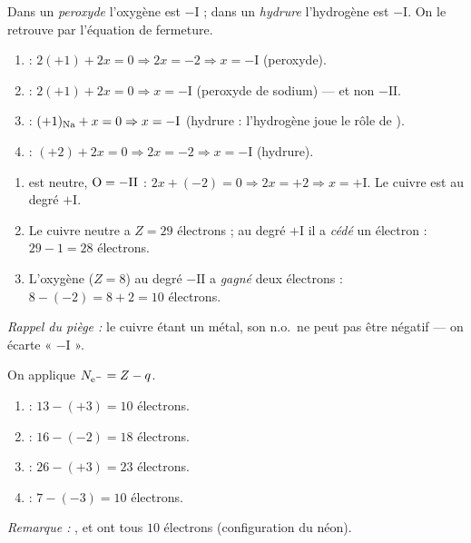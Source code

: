 \documentclass[11pt,a4paper]{article}
\begin{document}
\begin{corrige}
Dans un \emph{peroxyde} l'oxygène est $-\mathrm{I}$ ; dans un \emph{hydrure} l'hydrogène est $-\mathrm{I}$.
On le retrouve par l'équation de fermeture.
\begin{enumerate}[label=\alph*)]
  \item {} : $2(+1)+2x=0 \Rightarrow 2x=-2 \Rightarrow x=-\mathrm{I}$ (peroxyde).
  \item {} : $2(+1)+2x=0 \Rightarrow x=-\mathrm{I}$ (peroxyde de sodium) — et non $-\mathrm{II}$.
  \item {} : $(+1)_{\ce{Na}}+x=0 \Rightarrow x=-\mathrm{I}$ (hydrure : l'hydrogène joue le rôle de ).
  \item {} : $(+2)+2x=0 \Rightarrow 2x=-2 \Rightarrow x=-\mathrm{I}$ (hydrure).
\end{enumerate}
\end{corrige}

\begin{corrige}
\begin{enumerate}[label=\alph*)]
  \item {} est neutre, $\ce{O}=-\mathrm{II}$ : $2x+(-2)=0 \Rightarrow 2x=+2 \Rightarrow x=+\mathrm{I}$.
        Le cuivre est au degré $+\mathrm{I}$.
  \item Le cuivre neutre a $Z=29$ électrons ; au degré $+\mathrm{I}$ il a \emph{cédé} un électron :
        $29-1=\boxed{28}$ électrons.
  \item L'oxygène ($Z=8$) au degré $-\mathrm{II}$ a \emph{gagné} deux électrons : $8-(-2)=8+2=\boxed{10}$ électrons.
\end{enumerate}
\emph{Rappel du piège :} le cuivre étant un métal, son n.o.\ ne peut pas être négatif — on écarte « $-\mathrm{I}$ ».
\end{corrige}

\begin{corrige}
On applique $N_{\ce{e-}} = Z - q$.
\begin{enumerate}[label=\alph*)]
  \item {} : $13-(+3)=10$ électrons.
  \item {} : $16-(-2)=18$ électrons.
  \item {} : $26-(+3)=23$ électrons.
  \item {} : $7-(-3)=10$ électrons.
\end{enumerate}
\emph{Remarque :} ,  et  ont tous $10$ électrons (configuration du néon).
\end{corrige}
\end{document}
